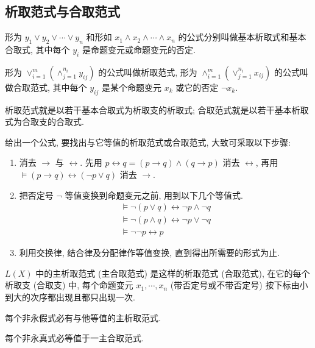 \documentclass[
    mode=hazy,
    color=blue,
    device=normal,
    lang=cn
]{elegantnote}
\begin{document}
\subsection{析取范式与合取范式}
\begin{definition}[基本析取式与基本合取式]
    形为 $y_1\lor y_2\lor \cdots\lor y_n$ 和形如 $x_1\land x_2\land \cdots\land x_n$ 的公式分别叫做基本析取式和基本合取式, 其中每个 $y_i$ 是命题变元或命题变元的否定.
\end{definition}
\begin{definition}[析取范式与合取范式]
    形为 $\lor_{i=1}^m\left(\land_{j=1}^{n_i} y_{ij}\right)$ 的公式叫做析取范式, 形为 $\land_{i=1}^m\left(\lor_{j=1}^{n_i} x_{ij}\right)$ 的公式叫做合取范式, 其中每个 $y_{ij}$ 是某个命题变元 $x_k$ 或它的否定 $\lnot x_k$.
\end{definition}
析取范式就是以若干基本合取式为析取支的析取式; 合取范式就是以若干基本析取式为合取支的合取式.

给出一个公式, 要找出与它等值的析取范式或合取范式, 大致可采取以下步骤:
\begin{enumerate}[label = $\arabic*^\circ$, topsep = -1em, listparindent = 2em]
    \item 消去 $\to$ 与 $\leftrightarrow$. 先用 $p\leftrightarrow q = (p\to q)\land (q\to p)$ 消去 $\leftrightarrow$, 再用 $\vDash (p\to q)\leftrightarrow (\lnot p\lor q)$ 消去 $\to$.
    \item 把否定号 $\lnot$ 等值变换到命题变元之前, 用到以下几个等值式.
    \begin{gather*}
        \vDash \lnot (p\lor q) \leftrightarrow \lnot p\land \lnot q\\
        \vDash \lnot (p\land q) \leftrightarrow \lnot p\lor \lnot q\\
        \vDash \lnot\lnot p \leftrightarrow p
    \end{gather*}
    \item 利用交换律, 结合律及分配律作等值变换, 直到得出所需要的形式为止.
\end{enumerate}
\begin{definition}[主析取范式与主合取范式]
    $L(X)$ 中的主析取范式 (主合取范式) 是这样的析取范式 (合取范式), 在它的每个析取支 (合取支) 中, 每个命题变元 $x_1, \cdots,x_n$ (带否定号或不带否定号) 按下标由小到大的次序都出现且都只出现一次.
\end{definition}
\begin{theorem}
    每个非永假式必有与他等值的主析取范式.
\end{theorem}
\begin{theorem}
    每个非永真式必等值于一主合取范式.
\end{theorem}
\end{document}
